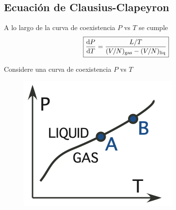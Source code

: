 \subsection{Ecuación de Clausius-Clapeyron}
A lo largo de la curva de coexistencia $P$ vs $T$ se cumple
\begin{equation}
	\boxed{\dv{P}{T}=\frac{L/T}{(V/N)_{\rm gas}-(V/N)_{\rm liq}}}
\end{equation}

Considere una curva de coexistencia $P$ vs $T$
\begin{figure}[h!]
	\centering
	\includegraphics[scale=0.4]{fig/CP-eq.png}
\end{figure}


